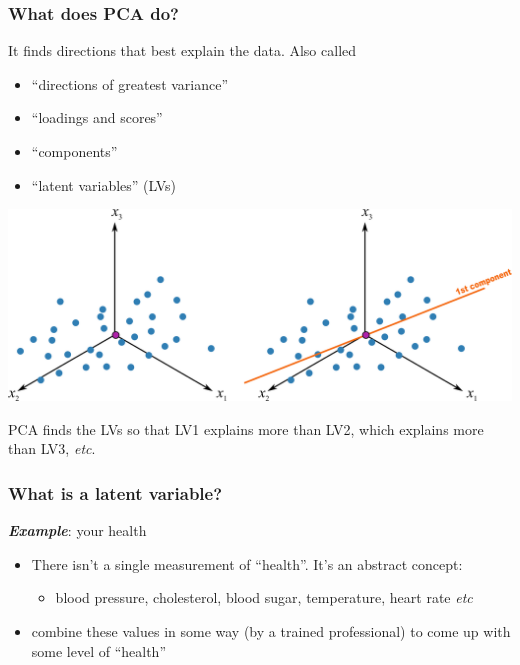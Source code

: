 \documentclass[handout, 12pt]{beamer}
\begin{document}
\begin{frame}\frametitle{What does PCA do?}

	It finds directions that best explain the data.  Also called
	
	\begin{itemize}
		\item  	``directions of greatest variance''
		\item	``loadings and scores''
		\item	``components''
		\item	``latent variables'' (LVs)
	\end{itemize}

	\begin{center}
		\includegraphics[width=\textwidth]{images/geometric-PCA-3-and-4-centered-with-first-component.png}
	\end{center}
	
	PCA finds the LVs so that LV1 explains more than LV2, which explains more than LV3, \emph{etc}.
\end{frame}

\begin{frame}\frametitle{What is a latent variable?}

	\textbf{\emph{Example}}: your health
	
	\begin{itemize}
		\item	There isn't a single measurement of ``health''.  It's an abstract concept: 
		
				\begin{itemize}
					\item	blood pressure, cholesterol, blood sugar, temperature, heart rate \emph{etc}
				\end{itemize}				
				
		\item	combine these values in some way (by a trained professional) to come up with some level of ``health''
	\end{itemize}
	
	\pause
	
	{\color{myGreen}{We can do this with any system!}}
\end{frame}
\end{document}
